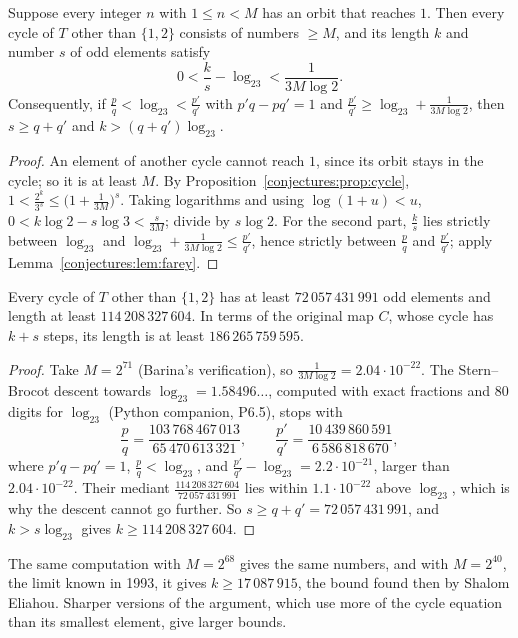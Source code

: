 \begin{theorem}\label{conjectures:thm:cyclelength}
Suppose every integer $n$ with $1\le n<M$ has an orbit that reaches $1$. Then every cycle of $T$ other than $\{1,2\}$ consists of numbers $\ge M$, and its
length $k$ and number $s$ of odd elements satisfy
\[
0<\frac ks-\log_23<\frac1{3M\log2}.
\]
Consequently, if $\frac pq<\log_23<\frac{p'}{q'}$ with $p'q-pq'=1$ and $\frac{p'}{q'}\ge\log_23+\frac1{3M\log2}$, then $s\ge q+q'$ and
$k>(q+q')\log_23$.
\end{theorem}
\begin{proof}
An element of another cycle cannot reach $1$, since its orbit stays in the cycle; so it is at least $M$. By Proposition~\ref{conjectures:prop:cycle},
$1<\frac{2^k}{3^s}\le\bigl(1+\frac1{3M}\bigr)^s$. Taking logarithms and using $\log(1+u)<u$,
$0<k\log2-s\log3<\frac s{3M}$; divide by $s\log2$. For the second part, $\frac ks$ lies strictly between $\log_23$ and
$\log_23+\frac1{3M\log2}\le\frac{p'}{q'}$, hence strictly between $\frac pq$ and $\frac{p'}{q'}$; apply Lemma~\ref{conjectures:lem:farey}.
\end{proof}

\begin{corollary}\label{conjectures:cor:cyclebound}
Every cycle of $T$ other than $\{1,2\}$ has at least $72\,057\,431\,991$ odd elements and length at least $114\,208\,327\,604$. In terms of the original map $C$,
whose cycle has $k+s$ steps, its length is at least $186\,265\,759\,595$.
\end{corollary}
\begin{proof}
Take $M=2^{71}$ (Barina's verification), so $\frac1{3M\log2}=2.04\cdot10^{-22}$. The Stern--Brocot descent towards $\log_23=1.58496\ldots$, computed
with exact fractions and $80$ digits for $\log_23$ (Python companion, P6.5), stops with
\[
\frac pq=\frac{103\,768\,467\,013}{65\,470\,613\,321},\qquad\frac{p'}{q'}=\frac{10\,439\,860\,591}{6\,586\,818\,670},
\]
where $p'q-pq'=1$, $\frac pq<\log_23$, and $\frac{p'}{q'}-\log_23=2.2\cdot10^{-21}$, larger than $2.04\cdot10^{-22}$. Their mediant
$\frac{114\,208\,327\,604}{72\,057\,431\,991}$ lies within $1.1\cdot10^{-22}$ above $\log_23$, which is why the descent cannot go further. So
$s\ge q+q'=72\,057\,431\,991$, and $k>s\log_23$ gives $k\ge114\,208\,327\,604$.
\end{proof}

The same computation with $M=2^{68}$ gives the same numbers, and with $M=2^{40}$, the limit known in 1993, it gives $k\ge17\,087\,915$, the bound found
then by Shalom Eliahou. Sharper versions of the argument, which use more of the cycle equation than its smallest element, give larger bounds.

